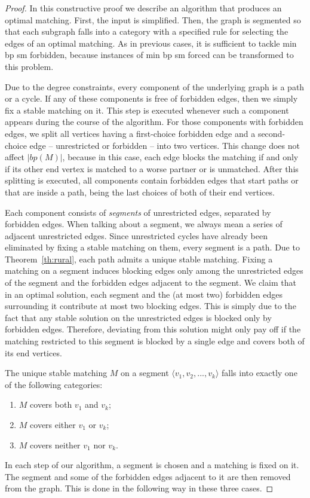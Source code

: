 \documentclass[preprint,12pt]{elsarticle}
\begin{document}
\begin{proof}
	In this constructive proof we describe an algorithm that produces an optimal matching. First, the input is simplified. Then, the graph is segmented so that each subgraph falls into a category with a specified rule for selecting the edges of an optimal matching. As in previous cases, it is sufficient to tackle {\sc min bp sm forbidden}, because instances of {\sc min bp sm forced} can be transformed to this problem.
	
	Due to the degree constraints, every component of the underlying graph is a path or a cycle. If any of these components is free of forbidden edges, then we simply fix a stable matching on it. This step is executed whenever such a component appears during the course of the algorithm. For those components with forbidden edges, we split all vertices having a first-choice forbidden edge and a second-choice edge -- unrestricted or forbidden -- into two vertices. This change does not affect $|bp(M)|$, because in this case, each edge blocks the matching if and only if its other end vertex is matched to a worse partner or is unmatched. After this splitting is executed, all components contain forbidden edges that start paths or that are inside a path, being the last choices of both of their end vertices. 
	
	Each component consists of \emph{segments} of unrestricted edges, separated by forbidden edges. When talking about a segment, we always mean a series of adjacent unrestricted edges. Since unrestricted cycles have already been eliminated by fixing a stable matching on them, every segment is a path. Due to Theorem~\ref{th:rural}, each path admits a unique stable matching. Fixing a matching on a segment induces blocking edges only among the unrestricted edges of the segment and the forbidden edges adjacent to the segment. We claim that in an optimal solution, each segment and the (at most two) forbidden edges surrounding it contribute at most two blocking edges. This is simply due to the fact that any stable solution on the unrestricted edges is blocked only by forbidden edges. Therefore, deviating from this solution might only pay off if the matching restricted to this segment is blocked by a single edge and covers both of its end vertices. 
	
	The unique stable matching $M$ on a segment $\langle v_1, v_2, ..., v_k \rangle$ falls into exactly one of the following categories:
	\begin{enumerate}
		\item $M$ covers both $v_1$ and $v_k$;
		\item $M$ covers either $v_1$ or $v_k$;
		\item $M$ covers neither $v_1$ nor $v_k$.
	\end{enumerate}
	In each step of our algorithm, a segment is chosen and a matching is fixed on it. The segment and some of the forbidden edges adjacent to it are then removed from the graph. This is done in the following way in these three cases.
	

\end{proof}
\end{document}
